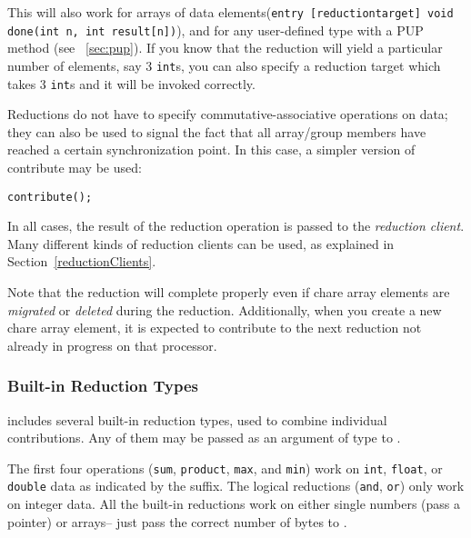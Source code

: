 This will also work for arrays of data 
elements({\tt entry [reductiontarget] void done(int n, int result[n])}), 
and for any user-defined type with a PUP method
(see ~\ref{sec:pup}). If you know that the reduction will yield a particular
number of elements, say 3 {\tt int}s, you can also specify a reduction target which
takes 3 {\tt int}s and it will be invoked correctly. 

Reductions do not have to specify commutative-associative operations on data;
they can also be used to signal the fact that all array/group members
have reached a certain synchronization point. In this case, a simpler version
of contribute may be used:


\begin{alltt}
    contribute();
\end{alltt}

In all cases, the result of the reduction operation is passed to the {\em reduction
client}.  Many different kinds of reduction clients can be used, as
explained in Section~\ref{reductionClients}.

Note that the reduction will complete properly even if chare array elements are {\em migrated}
or {\em deleted} during the reduction. Additionally, when you create a new chare array element, 
it is expected to contribute to the next reduction not already in progress on that
processor. 

\subsubsection{Built-in Reduction Types}
\label{builtin_reduction}

\charmpp{} includes several built-in reduction types, used to combine 
individual contributions.  Any of them may be passed as an argument of type
 to .

The first four operations ({\tt sum}, {\tt product}, {\tt max}, and {\tt min}) work on {\tt int},
{\tt float}, or {\tt double} data as indicated by the suffix.  The logical
reductions ({\tt and}, {\tt or}) only work on integer data.  All the built-in
reductions work on either single numbers (pass a pointer) or arrays-- just
pass the correct number of bytes to .

